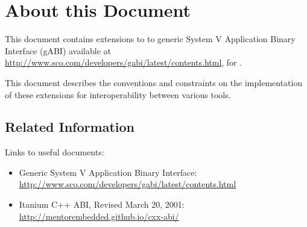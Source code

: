 \chapter{About this Document\label{intro}}

This document contains extensions to to generic System V Application
Binary Interface (gABI) available at
\url{http://www.sco.com/developers/gabi/latest/contents.html},
for \xOS.

This document describes the conventions and constraints on the
implementation of these extensions for interoperability between
various tools.

\section{Related Information}

Links to useful documents:
\begin{itemize}
 \item Generic System V Application Binary Interface:
       \url{http://www.sco.com/developers/gabi/latest/contents.html}
 \item Itanium C++ ABI, Revised March 20, 2001:
       \url{http://mentorembedded.github.io/cxx-abi/}
\end{itemize}

